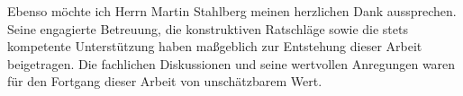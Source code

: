 Ebenso möchte ich Herrn Martin Stahlberg meinen herzlichen Dank aussprechen. Seine engagierte Betreuung, die konstruktiven Ratschläge sowie die stets kompetente Unterstützung haben maßgeblich zur Entstehung dieser Arbeit beigetragen. Die fachlichen Diskussionen und seine wertvollen Anregungen waren für den Fortgang dieser Arbeit von unschätzbarem Wert.






